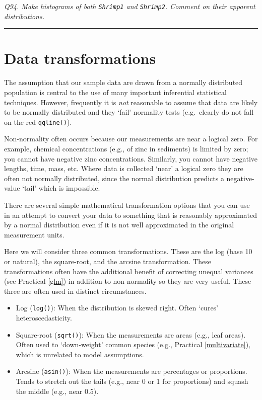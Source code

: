 \documentclass[
  11pt,
  a4paper,
]{book}
\providecommand{\tightlist}{%
  \setlength{\itemsep}{0pt}\setlength{\parskip}{0pt}}
\begin{document}
\emph{Q94. Make histograms of both \texttt{Shrimp1} and \texttt{Shrimp2}. Comment on their apparent distributions.}

\begin{center}\rule{0.5\linewidth}{0.5pt}\end{center}

\hypertarget{transformations}{%
\section{Data transformations}\label{transformations}}

The assumption that our sample data are drawn from a normally distributed population is central to the use of many important inferential statistical techniques. However, frequently it is \emph{not} reasonable to assume that data are likely to be normally distributed and they `fail' normality tests (e.g.~clearly do not fall on the red \texttt{qqline()}).

Non-normality often occurs because our measurements are near a logical zero. For example, chemical concentrations (e.g., of zinc in sediments) is limited by zero; you cannot have negative zinc concentrations. Similarly, you cannot have negative lengths, time, mass, etc. Where data is collected `near' a logical zero they are often not normally distributed, since the normal distribution predicts a negative-value `tail' which is impossible.

There are several simple mathematical transformation options that you can use in an attempt to convert your data to something that is reasonably approximated by a normal distribution even if it is not well approximated in the original measurement units.

Here we will consider three common transformations. These are the log (base 10 or natural), the square-root, and the arcsine transformation. These transformations often have the additional benefit of correcting unequal variances (see Practical \ref{glm}) in addition to non-normality so they are very useful. These three are often used in distinct circumstances.

\begin{itemize}
\tightlist
\item
  Log (\texttt{log()}): When the distribution is skewed right. Often `cures' heteroscedasticity.\\
\item
  Square-root (\texttt{sqrt()}): When the measurements are areas (e.g., leaf areas). Often used to `down-weight' common species (e.g., Practical \ref{multivariate}), which is unrelated to model assumptions.\\
\item
  Arcsine (\texttt{asin()}): When the measurements are percentages or proportions. Tends to stretch out the tails (e.g., near 0 or 1 for proportions) and squash the middle (e.g., near 0.5).
\end{itemize}
\end{document}
